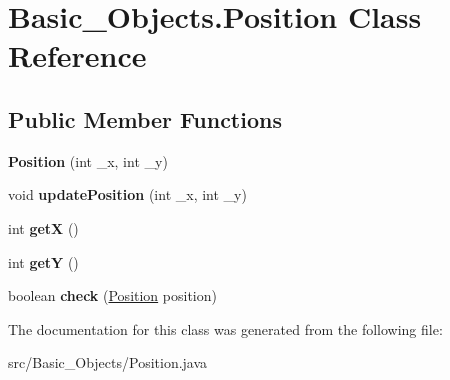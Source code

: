 \hypertarget{class_basic___objects_1_1_position}{\section{Basic\-\_\-\-Objects.\-Position Class Reference}
\label{class_basic___objects_1_1_position}
}
\subsection*{Public Member Functions}
\begin{DoxyCompactItemize}
\item 
\hypertarget{class_basic___objects_1_1_position_aebfc2323eee12f74ec390a24635117d6}{{\bfseries Position} (int \-\_\-x, int \-\_\-y)}\label{class_basic___objects_1_1_position_aebfc2323eee12f74ec390a24635117d6}

\item 
\hypertarget{class_basic___objects_1_1_position_abeb57b2c9f06ea343139f1d23b5d18f4}{void {\bfseries update\-Position} (int \-\_\-x, int \-\_\-y)}\label{class_basic___objects_1_1_position_abeb57b2c9f06ea343139f1d23b5d18f4}

\item 
\hypertarget{class_basic___objects_1_1_position_a6fa4b5005c59bda78470e793a7a13142}{int {\bfseries get\-X} ()}\label{class_basic___objects_1_1_position_a6fa4b5005c59bda78470e793a7a13142}

\item 
\hypertarget{class_basic___objects_1_1_position_a827d50dd8c09eba8eb2aa182bfadf5c2}{int {\bfseries get\-Y} ()}\label{class_basic___objects_1_1_position_a827d50dd8c09eba8eb2aa182bfadf5c2}

\item 
\hypertarget{class_basic___objects_1_1_position_a13be729b959179166226df0a99ea78d6}{boolean {\bfseries check} (\hyperlink{class_basic___objects_1_1_position}{Position} position)}\label{class_basic___objects_1_1_position_a13be729b959179166226df0a99ea78d6}

\end{DoxyCompactItemize}


The documentation for this class was generated from the following file\-:\begin{DoxyCompactItemize}
\item 
src/\-Basic\-\_\-\-Objects/Position.\-java\end{DoxyCompactItemize}
